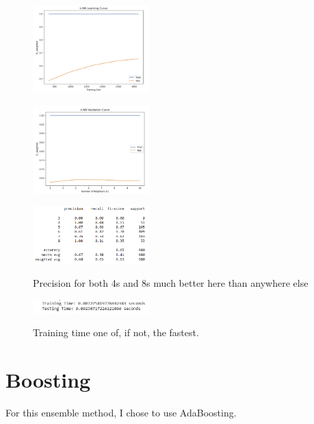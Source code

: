\documentclass[conference]{IEEEtran}
\begin{document}
\begin{figure}[H]
    \centering
    \includegraphics[width=0.40\textwidth]{Red Wine Quality Graph Images/KNN/knn lc final.png}
    \label{fig:enter-label}
    \caption{}
\end{figure}
\begin{figure}[H]
    \centering
    \includegraphics[width=0.40\textwidth]{Red Wine Quality Graph Images/KNN/knn vc final.png}
    \label{fig:enter-label}
    \caption{}
\end{figure}

\begin{figure}[H]
    \centering
    \includegraphics[width=0.40\textwidth]{Red Wine Quality Graph Images/KNN/knn cr.png}
    \label{fig:enter-label}
    \caption{Precision for both 4s and 8s much better here than anywhere else}
\end{figure}
\begin{figure}[H]
    \centering
    \includegraphics[width=0.40\textwidth]{Red Wine Quality Graph Images/KNN/knn wct.png}
    \label{fig:enter-label}
    \caption{Training time one of, if not, the fastest.}
\end{figure}

\section{Boosting}
For this ensemble method, I chose to use AdaBoosting. 
\end{document}
